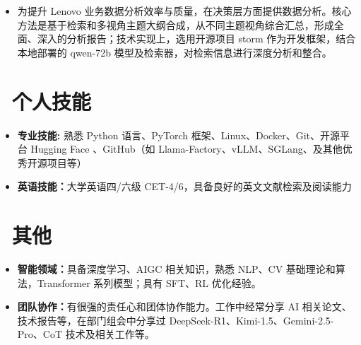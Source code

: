 \documentclass{resume}
\begin{document}

\begin{itemize}[itemsep=1ex, topsep=1ex, parsep=0.5ex, leftmargin=1em]
  \item 为提升 Lenovo 业务数据分析效率与质量，在决策层方面提供数据分析。核心方法是基于检索和多视角主题大纲合成，从不同主题视角综合汇总，形成全面、深入的分析报告；技术实现上，选用开源项目 storm 作为开发框架，结合本地部署的 qwen-72b 模型及检索器，对检索信息进行深度分析和整合。
\end{itemize}




\section{\faCogs\ 个人技能}
\begin{itemize}[parsep=0.5ex]
  \item \textbf{专业技能:} 熟悉 Python 语言、PyTorch 框架、Linux、Docker、Git、开源平台 Hugging Face 、GitHub（如 Llama-Factory、vLLM、SGLang、及其他优秀开源项目等）
  \item \textbf{英语技能：}大学英语四/六级 CET-4/6，具备良好的英文文献检索及阅读能力
\end{itemize}


\section{\faInfo\ 其他}
\begin{itemize}[parsep=0.5ex]
  \item \textbf{智能领域：}具备深度学习、AIGC 相关知识，熟悉 NLP、CV 基础理论和算法，Transformer 系列模型；具有 SFT、RL 优化经验。
  \item \textbf{团队协作：}有很强的责任心和团体协作能力。工作中经常分享 AI 相关论文、技术报告等，在部门组会中分享过 DeepSeek-R1、Kimi-1.5、Gemini-2.5-Pro、CoT 技术及相关工作等。

\end{itemize}

%
%
\end{document}
